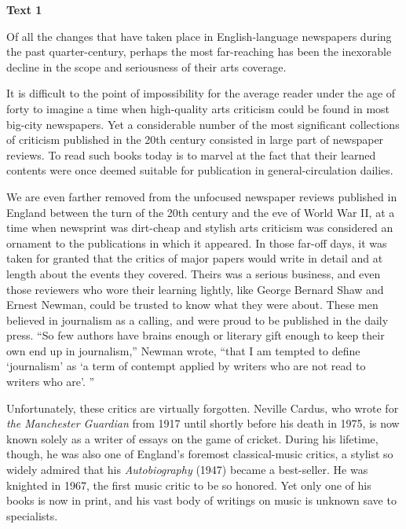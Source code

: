 
\begin{center}\textbf{Text 1}\end{center}

\qquad Of all the changes that have taken place in English-language newspapers during the past quarter-century, perhaps the most far-reaching has been the inexorable decline in the scope and seriousness of their arts coverage.

\qquad It is difficult to the point of impossibility for the average reader under the age of forty to imagine a time when high-quality arts criticism could be found in most big-city newspapers. Yet a considerable number of the most significant collections of criticism published in the 20th century consisted in large part of newspaper reviews. To read such books today is to marvel at the fact that their learned contents were once deemed suitable for publication in general-circulation dailies.

\qquad We are even farther removed from the unfocused newspaper reviews published in England between the turn of the 20th century and the eve of World War II, at a time when newsprint was dirt-cheap and stylish arts criticism was considered an ornament to the publications in which it appeared. In those far-off days, it was taken for granted that the critics of major papers would write in detail and at length about the events they covered. Theirs was a serious business, and even those reviewers who wore their learning lightly, like George Bernard Shaw and Ernest Newman, could be trusted to know what they were about. These men believed in journalism as a calling, and were proud to be published in the daily press. ``So few authors have brains enough or literary gift enough to keep their own end up in journalism,'' Newman wrote, ``that I am tempted to define `journalism' as `a term of contempt applied by writers who are not read to writers who are'. ''

\qquad Unfortunately, these critics are virtually forgotten. Neville Cardus, who wrote for \emph{the Manchester Guardian} from 1917 until shortly before his death in 1975, is now known solely as a writer of essays on the game of cricket. During his lifetime, though, he was also one of England's foremost classical-music critics, a stylist so widely admired that his \emph{Autobiography} (1947) became a best-seller. He was knighted in 1967, the first music critic to be so honored. Yet only one of his books is now in print, and his vast body of writings on music is unknown save to specialists.

